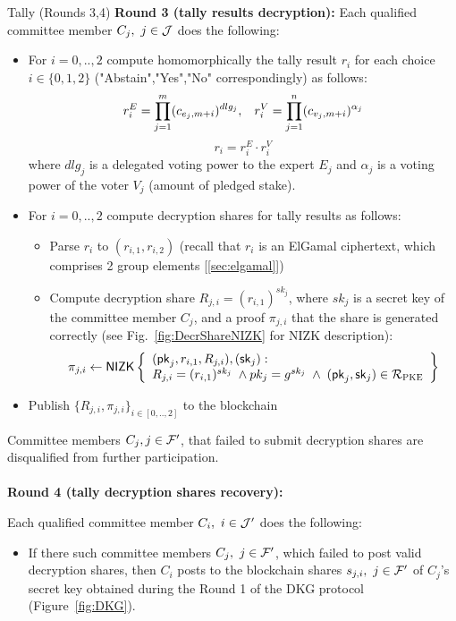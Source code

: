 \begin{boxfig}{\label{fig:tally2}Tally (Rounds 3,4)}{}
\textbf{Round 3 (tally results decryption):}
Each qualified committee member $C_j,\ j\in\JJJ$ does the following:
\begin{itemize}
    \item For $i = 0,..,2$ compute homomorphically the tally result $r_i$ for each choice $i\in\{0,1,2\}$ ("Abstain","Yes","No" correspondingly) as follows:
    \[r_i^E=\prod_{j=1}^{m} (c_{e_j,m+i})^{dlg_j},\hspace*{3mm} r_i^V=\prod_{j=1}^{n} (c_{v_j,m+i})^{\alpha_j}\]
    \[r_i=r_i^E \cdot r_i^V\]
    where $dlg_j$ is a delegated voting power to the expert $E_j$ and $\alpha_j$ is a voting power of the voter $V_j$ (amount of pledged stake). 
    \item For $i = 0,.., 2$ compute decryption shares for tally results as follows:
    \begin{itemize}
        \item Parse $r_i$ to $(r_{i,1}, r_{i,2})$ (recall that $r_{i}$ is an ElGamal ciphertext, which comprises 2 group elements [\ref{sec:elgamal}])
        \item Compute decryption share $R_{j,i}=(r_{i,1})^{sk_j}$, where $sk_j$ is a secret key of the committee member $C_j$, and a proof $\pi_{j,i}$ that the share is generated correctly (see Fig.~\ref{fig:DecrShareNIZK} for NIZK description):
        \begin{equation*}
        \pi_{j,i}\leftarrow\mathsf{NIZK}\left\{\begin{array}{l} (\mathsf{pk}_j, r_{i,1}, R_{j,i}),(\mathsf{sk}_j): \\
         R_{j,i}=(r_{i,1})^{sk_j} \; \wedge pk_j=g^{sk_j} \; \wedge \;  (\mathsf{pk}_j,\mathsf{sk}_j)\in\mathcal{R}_{\textsc{PKE}} \end{array}\right\}
        \end{equation*}
    \end{itemize}
    \item Publish $\{R_{j,i}, \pi_{j,i}\}_{i \in [0,..,2]}$ to the blockchain
\end{itemize}
Committee members $C_j, j \in \mathcal{F}'$, that failed to submit decryption shares are disqualified from further participation.
\\~\\
\textbf{Round 4 (tally decryption shares recovery):}

Each qualified committee member $C_i,\ i \in \mathcal{J}'$ does the following:
\begin{itemize}
    \item If there such committee members $C_j,\ j \in \FFF'$, which failed to post valid decryption shares, then $C_i$ posts to the blockchain shares $s_{j,i},\ j \in \mathcal{F}'$ of $C_j$'s secret key obtained during the Round 1 of the DKG protocol (Figure~\ref{fig:DKG}).
\end{itemize}


\end{boxfig}
